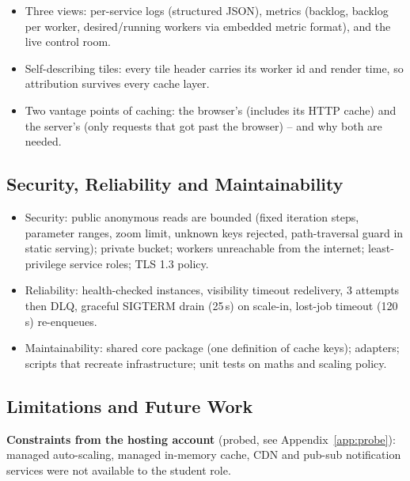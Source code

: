 \documentclass[a4paper,12pt]{article}
\begin{document}
\begin{yourwriting}
\begin{itemize}
    \item Three views: per-service logs (structured JSON), metrics (backlog, backlog per worker, desired/running workers via embedded metric format), and the live control room.
    \item Self-describing tiles: every tile header carries its worker id and render time, so attribution survives every cache layer.
    \item Two vantage points of caching: the browser's (includes its HTTP cache) and the server's (only requests that got past the browser) -- and why both are needed.
\end{itemize}
\end{yourwriting}

\subsection{Security, Reliability and Maintainability}

\begin{yourwriting}
\begin{itemize}
    \item Security: public anonymous reads are bounded (fixed iteration steps, parameter ranges, zoom limit, unknown keys rejected, path-traversal guard in static serving); private bucket; workers unreachable from the internet; least-privilege service roles; TLS 1.3 policy.
    \item Reliability: health-checked instances, visibility timeout redelivery, 3 attempts then DLQ, graceful SIGTERM drain (25\,s) on scale-in, lost-job timeout (120\,s) re-enqueues.
    \item Maintainability: shared core package (one definition of cache keys); adapters; scripts that recreate infrastructure; unit tests on maths and scaling policy.
\end{itemize}
\end{yourwriting}

\subsection{Limitations and Future Work}
\label{sec:limits}

\begin{riskbox}
\textbf{Constraints from the hosting account} (probed, see Appendix~\ref{app:probe}): managed auto-scaling, managed in-memory cache, CDN and pub-sub notification services were not available to the student role.
\end{riskbox}
\end{document}
